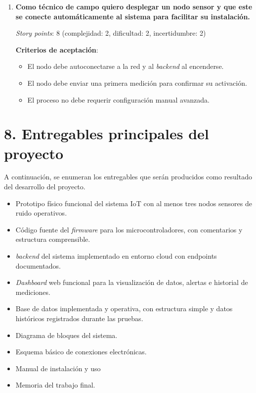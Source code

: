 \documentclass[
11pt, %
]{charter}
\begin{document}
\begin{enumerate}
    \item \textbf{Como técnico de campo quiero desplegar un nodo sensor y que este se conecte automáticamente al sistema para facilitar su instalación.}

    \textit{Story points}: 8 (complejidad: 2, dificultad: 2, incertidumbre: 2)

    \textbf{Criterios de aceptación}:
    \begin{itemize}
        \item El nodo debe autoconectarse a la red y al \textit{backend} al encenderse.
        \item El nodo debe enviar una primera medición para confirmar su activación.
        \item El proceso no debe requerir configuración manual avanzada.
    \end{itemize}
\end{enumerate}

\section{8. Entregables principales del proyecto}
\label{sec:entregables}

A continuación, se enumeran los entregables que serán producidos como resultado del desarrollo del proyecto. 

\begin{itemize}
    \item Prototipo físico funcional del sistema IoT con al menos tres nodos sensores de ruido operativos.
    \item Código fuente del \textit{firmware} para los microcontroladores, con comentarios y estructura comprensible.
    \item \textit{backend} del sistema implementado en entorno cloud con endpoints documentados.
    \item \textit{Dashboard} web funcional para la visualización de datos, alertas e historial de mediciones.
    \item Base de datos implementada y operativa, con estructura simple y datos históricos registrados durante las pruebas.
    \item Diagrama de bloques del sistema.
    \item Esquema básico de conexiones electrónicas.
    \item Manual de instalación y uso
    \item Memoria del trabajo final.
    
\end{itemize}
\end{document}
